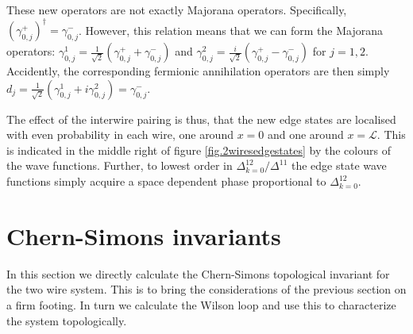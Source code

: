 These new operators are not exactly Majorana operators. Specifically, $(\gamma^{+}_{0, j})^\dagger = \gamma^{-}_{0, j}$. However, this relation means that we can form the Majorana operators: $\gamma^{1}_{0,j} = \frac{1}{\sqrt{2}}(\gamma^{+}_{0, j} + \gamma^{-}_{0, j})$ and $\gamma^{2}_{0,j} = \frac{i}{\sqrt{2}}(\gamma^{+}_{0, j} - \gamma^{-}_{0, j})$ for $j = 1, 2$. Accidently, the corresponding fermionic annihilation operators are then simply $d_j = \frac{1}{\sqrt{2}}\left(\gamma^1_{0,j} + i\gamma^2_{0,j} \right) = \gamma^{-}_{0,j}$. 

The effect of the interwire pairing is thus, that the new edge states are localised with even probability in each wire, one around $x = 0$ and one around $x = \mathcal{L}$. This is indicated in the middle right of figure \ref{fig.2wiresedgestates} by the colours of the wave functions. Further, to lowest order in $\Delta^{12}_{k = 0}/\Delta^{11}$ the edge state wave functions simply acquire a space dependent phase proportional to $\Delta^{12}_{k=0}$. 

\section{Chern-Simons invariants}
\label{sec.2wires_CSinv}
In this section we directly calculate the Chern-Simons topological invariant for the two wire system. This is to bring the considerations of the previous section on a firm footing. In turn we calculate the Wilson loop and use this to characterize the system topologically. 

